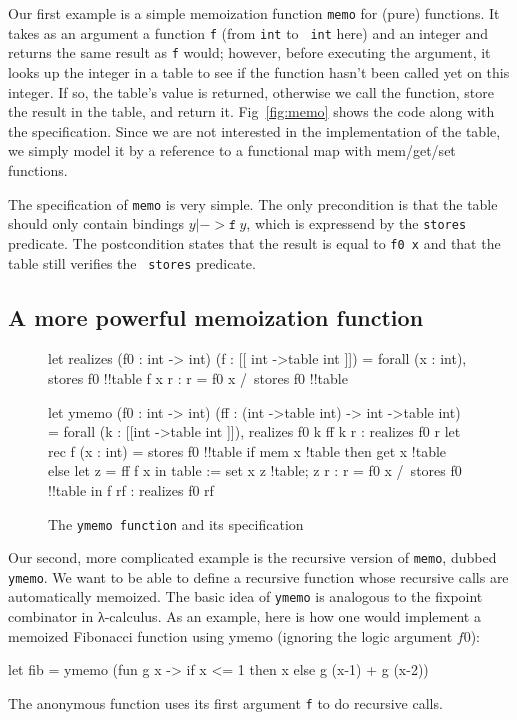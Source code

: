 \documentclass[a4paper]{llncs}
\begin{document}
Our first example is a simple memoization function {\tt memo} for (pure)
functions.  It takes as an argument a function {\tt f} (from {\tt int} to {\tt
int} here) and an integer and returns the same result as {\tt f} would;
however, before executing the argument, it looks up the integer in a table to
see if the function hasn't been called yet on this integer. If so, the table's
value is returned, otherwise we call the function, store the result in the
table, and return it. Fig~\ref{fig:memo} shows the code along with the
specification. Since we are not interested in the implementation of the table,
we simply model it by a reference to a functional map with mem/get/set functions.

The specification of {\tt memo} is very simple. The only precondition is that
the table should only contain bindings $y |-> {\mathtt f}~y$, which is
expressend by the {\tt stores} predicate. The postcondition states that the
result is equal to {\tt f0~x} and that the table still verifies the {\tt
stores} predicate.

\subsection{A more powerful memoization function}

\begin{figure}[tpb]
\begin{who}
  let realizes (f0 : int -> int) (f : [[ int ->{table} int ]]) =
    forall (x : int),
    { stores f0 !!table } f x { r : r = f0 x /\ stores f0 !!table }

  let ymemo (f0 : int -> int) 
            (ff : (int ->{table} int) ->{} int ->{table} int) = 
    { forall (k : [[int ->{table} int ]]),
        { realizes f0 k} ff k { r : realizes f0 r} }
    let rec f (x : int) =
      { stores f0 !!table }
      if mem x !table then get x !table
      else
        let z = ff f x in
        table := set x z !table; z
      {r : r = f0 x /\ stores f0 !!table}
    in f
  { rf : realizes f0 rf }
\end{who}
\caption{The {\tt ymemo function} and its specification}
  \label{fig:ymemo}
\end{figure}

Our second, more complicated example is the recursive version of {\tt memo},
dubbed {\tt ymemo}. We want to be able to define a recursive function whose
recursive calls are automatically memoized. The basic idea of {\tt ymemo} is
analogous to the fixpoint combinator in λ-calculus. As an example, here is how
one would implement a memoized Fibonacci function
using ymemo (ignoring the logic argument $f0$):
\begin{ocaml}
  let fib = 
    ymemo (fun g x -> if x <= 1 then x else g (x-1) + g (x-2))
\end{ocaml}
The anonymous function uses its first argument {\tt f} to do recursive calls.
\end{document}
